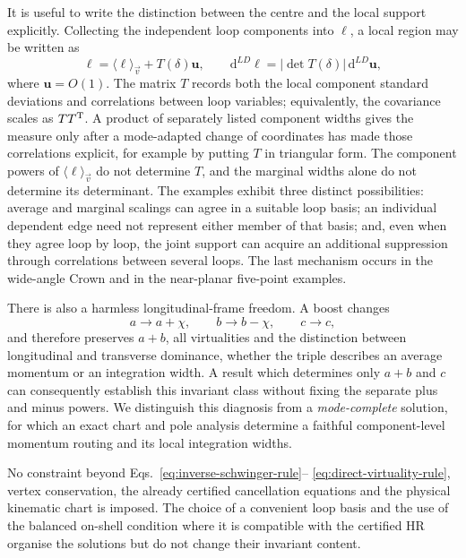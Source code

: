 \documentclass[a4paper,11pt]{article}
\newcommand{\dd}{\mathrm d}
\begin{document}
It is useful to write the distinction between the centre and the local
support explicitly.  Collecting the independent loop components into
\(\boldsymbol\ell\), a local region may be written as
\begin{equation}
 \boldsymbol\ell=\langle\boldsymbol\ell\rangle_{\vec v}
 +T(\delta)\boldsymbol u,
 \qquad
 \dd^{LD}\boldsymbol\ell
 =|\det T(\delta)|\,\dd^{LD}\boldsymbol u,
 \label{eq:loop-centre-width-matrix}
\end{equation}
where \(\boldsymbol u=O(1)\).  The matrix \(T\) records both the local component
standard deviations and correlations between loop variables; equivalently,
the covariance scales as \(T T^{\rm T}\).  A product of separately
listed component widths gives the measure only after a mode-adapted change of
coordinates has made those correlations explicit, for example by putting
\(T\) in triangular form.  The component powers of
\(\langle\boldsymbol\ell\rangle_{\vec v}\) do not determine \(T\), and the marginal widths
alone do not determine its determinant.  The examples exhibit three distinct
possibilities:
average and marginal scalings can agree in a suitable loop basis; an
individual dependent edge need not represent either member of that basis;
and, even when they agree loop by loop, the joint support can acquire an
additional suppression through correlations between several loops.  The last
mechanism occurs in the wide-angle Crown and in the near-planar five-point
examples.

There is also a harmless longitudinal-frame freedom.  A boost changes
\begin{equation}
 a\longrightarrow a+\chi,\qquad
 b\longrightarrow b-\chi,\qquad
 c\longrightarrow c,
 \label{eq:longitudinal-boost-freedom}
\end{equation}
and therefore preserves \(a+b\), all virtualities and the distinction
between longitudinal and transverse dominance, whether the triple describes
an average momentum or an integration width.  A result which determines only
\(a+b\) and \(c\) can consequently establish this invariant class without
fixing the separate plus and minus powers.  We distinguish this diagnosis
from a \emph{mode-complete} solution, for which an exact chart and pole
analysis determine a faithful component-level momentum routing and its local
integration widths.

No constraint beyond Eqs.~\eqref{eq:inverse-schwinger-rule}--
\eqref{eq:direct-virtuality-rule}, vertex conservation, the already certified
cancellation equations and the physical kinematic chart is imposed.  The
choice of a convenient loop basis and the use of the balanced on-shell condition where
it is compatible with the certified HR organise the solutions but do not
change their invariant content.
\end{document}
